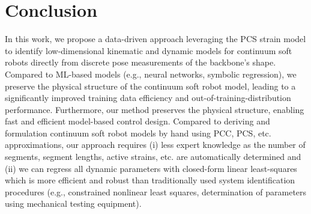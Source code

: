 
\section{Conclusion}
In this work, we propose a data-driven approach leveraging the \gls{PCS} strain model to identify low-dimensional kinematic and dynamic models for continuum soft robots directly from discrete pose measurements of the backbone's shape.
Compared to \gls{ML}-based models (e.g., neural networks, symbolic regression), we preserve the physical structure of the continuum soft robot model, leading to a significantly improved training data efficiency and out-of-training-distribution performance.
Furthermore, our method preserves the physical structure, enabling fast and efficient model-based control design.
Compared to deriving and formulation continuum soft robot models by hand using \gls{PCC}, \gls{PCS}, etc. approximations, our approach requires (i) less expert knowledge as the number of segments, segment lengths, active strains, etc. are automatically determined and (ii) we can regress all dynamic parameters with closed-form linear least-squares which is more efficient and robust than traditionally used system identification procedures (e.g., constrained nonlinear least squares, determination of parameters using mechanical testing equipment).

